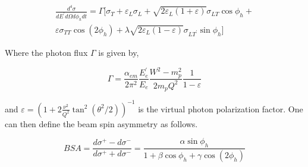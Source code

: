 \begin{equation}
\begin{split}
  \frac{d^4 \sigma}{dE^\prime d\Omega d\phi_h dt} = \Gamma \Big[ \sigma_T + \varepsilon_L \sigma_L + \sqrt{2\varepsilon_L(1+\varepsilon)} \sigma_{LT} \cos\phi_h + \\
    \varepsilon \sigma_{TT} \cos(2\phi_h) + \lambda \sqrt{2\varepsilon_L(1-\varepsilon)} \sigma_{LT^\prime} \sin \phi_h \Big]
\end{split}
\end{equation}

Where the photon flux $\Gamma$ is given by, 

\begin{equation}
  \Gamma = \frac{\alpha_{em}}{2\pi^2} \frac{E_e^\prime}{E_e} \frac{W^2-m_p^2}{2 m_p Q^2} \frac{1}{1-\varepsilon}
\end{equation}

and $\varepsilon = (1+2\frac{\nu^2}{Q^2}\tan^2(\theta^2/2))^{-1}$ is the virtual photon polarization factor.  One can then define the beam spin asymmetry as follows.

\begin{equation}
  BSA = \frac{d\sigma^+ - d\sigma^-}{d\sigma^+ + d\sigma^-} = \frac{\alpha \sin \phi_h}{1 + \beta \cos \phi_h + \gamma \cos(2\phi_h)}
\end{equation}


